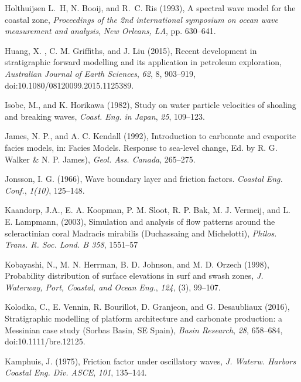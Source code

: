 \documentclass[default,jgrga]{agutex2015}
\begin{document}
\begin{article}
\begin{thebibliography}{}
Holthuijsen L.~H, N. Booij, and R.~C. Ris (1993), A spectral wave model for the coastal zone, \textit{Proceedings of the 2nd international symposium on ocean wave measurement and analysis}, \textit{New Orleans, LA}, pp. 630--641.

Huang, X. , C. M. Griffiths, and J. Liu (2015), Recent development in stratigraphic forward modelling and its application in petroleum exploration, \textit{Australian Journal of Earth Sciences}, \textit{62}, 8, 903--919, doi:10.1080/08120099.2015.1125389.

Isobe, M., and K. Horikawa (1982), Study on water particle velocities of shoaling and breaking waves,  \textit{Coast. Eng. in Japan},  \textit{25}, 109--123.

James, N. P., and A. C. Kendall (1992), Introduction to carbonate and evaporite facies models, in: Facies Models. Response to sea-level change, Ed. by R. G. Walker \& N. P. James), \textit{Geol. Ass. Canada}, 265--275.

Jonsson, I. G. (1966), Wave boundary layer and friction factors. \textit{Coastal Eng. Conf.}, \textit{1(10)}, 125--148.

Kaandorp, J.A., E. A. Koopman, P. M. Sloot, R. P. Bak, M. J. Vermeij, and L. E. Lampmann, (2003), Simulation and analysis of flow patterns around the scleractinian coral Madracis mirabilis (Duchassaing and Michelotti), \textit{Philos. Trans. R. Soc. Lond. B 358}, 1551--57

Kobayashi, N., M. N. Herrman, B. D. Johnson, and M. D. Orzech (1998), Probability distribution of surface elevations in surf and swash zones, \textit{J. Waterway, Port, Coastal, and Ocean Eng.}, \textit{124}, (3), 99--107.

Kolodka, C., E. Vennin, R. Bourillot, D. Granjeon, and G. Desaubliaux (2016), Stratigraphic modelling of platform architecture and carbonate production: a Messinian case study (Sorbas Basin, SE Spain), \textit{Basin Research}, \textit{28}, 658--684, doi:10.1111/bre.12125.

Kamphuis, J. (1975), Friction factor under oscillatory waves, \textit{J. Waterw. Harbors Coastal Eng. Div. ASCE}, \textit{101}, 135--144.


\end{thebibliography}
\end{article}
\end{document}
